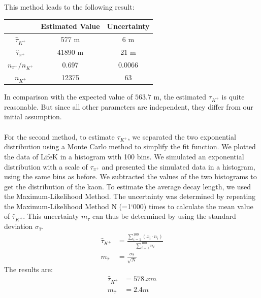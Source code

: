 \documentclass[a4paper,parskip,11pt, DIV12]{scrreprt}
\begin{document}
	
	
	This method leads to the following result:\\
	\begin{tabular}{c|cc}
		\centering
		& Estimated Value  & Uncertainty \\ 
		\hline 
		$\hat{\tau}_{K^+}$ & 577 m & 6 m \\ 
		
		$\hat{\tau}_{\pi^+}$ & 41890 m  & 21 m  \\
		
		${n_{\pi^+}}/{n_{K^+}}$ & 0.697 & 0.0066 \\ 
		
		$n_{K^+}$ & 12375 & 63 \\
	\end{tabular} 
	
	In comparison with the expected value of $563.7$ m, the estimated $\tau_{K^+}$ is quite reasonable. But since all other parameters are independent, they differ from our initial assumption.
	\\
	\\
	For the second method, to estimate $\tau_{K^+}$, we separated the two exponential distribution using a Monte Carlo method to simplify the fit function. We plotted the data of LifeK in a histogram with 100 bins. We simulated an exponential distribution with a scale of $\tau_{\pi^+}$ and presented the simulated data in a histogram, using the same bins as before. We subtracted the values of the two histograms to get the distribution of the kaon. To estimate the average decay length, we used the Maximum-Likelihood Method. The uncertainty was determined by repeating the Maximum-Likelihood Method N (=1`000) times to calculate the mean value of $\hat{\tau}_{K^+}$. This uncertainty $m_{\tau}$ can thus be determined by using the standard deviation $\sigma_{\hat{\tau}}$.
	\begin{align*}
		\hat{\tau}_{K^+}&= \frac{\sum_{i=1}^{100} (x_i \cdot n_i)}{\sum_{i=1}^{100} n_i}\\
		m_{\hat{\tau}}&= \frac{\sigma_{\hat{\tau}}}{\sqrt{N}}
	\end{align*}
	The results are:
	\begin{align*}
		\hat{\tau}_{K^+}&=578.x m \\
		m_{\hat{\tau}}&=2.4 m
	\end{align*}
	
\end{document}
